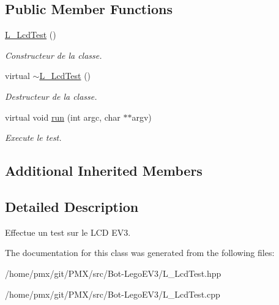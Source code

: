 \subsection*{Public Member Functions}
\begin{DoxyCompactItemize}
\item 
\mbox{\label{classL__LcdTest_ad680aa7a02fcba0096a869d9e1c32cff}} 
\hyperlink{classL__LcdTest_ad680aa7a02fcba0096a869d9e1c32cff}{L\+\_\+\+Lcd\+Test} ()
\begin{DoxyCompactList}\small\item\em Constructeur de la classe. \end{DoxyCompactList}\item 
\mbox{\label{classL__LcdTest_ad08725c9369f4e395518a49d88ad8b31}} 
virtual \hyperlink{classL__LcdTest_ad08725c9369f4e395518a49d88ad8b31}{$\sim$\+L\+\_\+\+Lcd\+Test} ()
\begin{DoxyCompactList}\small\item\em Destructeur de la classe. \end{DoxyCompactList}\item 
\mbox{\label{classL__LcdTest_ae3d35792d8e5332141b8c4f45c365960}} 
virtual void \hyperlink{classL__LcdTest_ae3d35792d8e5332141b8c4f45c365960}{run} (int argc, char $\ast$$\ast$argv)
\begin{DoxyCompactList}\small\item\em Execute le test. \end{DoxyCompactList}\end{DoxyCompactItemize}
\subsection*{Additional Inherited Members}


\subsection{Detailed Description}
Effectue un test sur le L\+CD E\+V3. 

The documentation for this class was generated from the following files\+:\begin{DoxyCompactItemize}
\item 
/home/pmx/git/\+P\+M\+X/src/\+Bot-\/\+Lego\+E\+V3/L\+\_\+\+Lcd\+Test.\+hpp\item 
/home/pmx/git/\+P\+M\+X/src/\+Bot-\/\+Lego\+E\+V3/L\+\_\+\+Lcd\+Test.\+cpp\end{DoxyCompactItemize}
